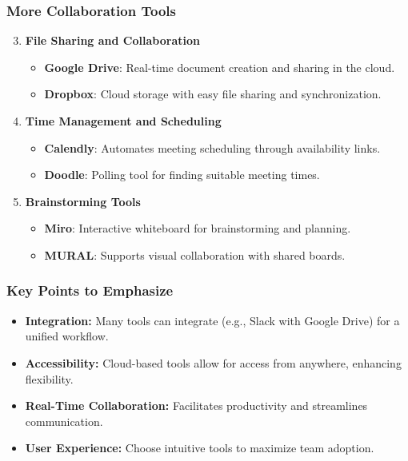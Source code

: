 \documentclass[aspectratio=169]{beamer}
\begin{document}
\begin{frame}[fragile]
    \frametitle{More Collaboration Tools}
    \begin{enumerate}
        \setcounter{enumi}{2} %
        \item \textbf{File Sharing and Collaboration}
        \begin{itemize}
            \item \textbf{Google Drive}: Real-time document creation and sharing in the cloud.
            \item \textbf{Dropbox}: Cloud storage with easy file sharing and synchronization.
        \end{itemize}

        \item \textbf{Time Management and Scheduling}
        \begin{itemize}
            \item \textbf{Calendly}: Automates meeting scheduling through availability links.
            \item \textbf{Doodle}: Polling tool for finding suitable meeting times.
        \end{itemize}

        \item \textbf{Brainstorming Tools}
        \begin{itemize}
            \item \textbf{Miro}: Interactive whiteboard for brainstorming and planning.
            \item \textbf{MURAL}: Supports visual collaboration with shared boards.
        \end{itemize}
    \end{enumerate}
\end{frame}

\begin{frame}[fragile]
    \frametitle{Key Points to Emphasize}
    \begin{itemize}
        \item \textbf{Integration:} Many tools can integrate (e.g., Slack with Google Drive) for a unified workflow.
        \item \textbf{Accessibility:} Cloud-based tools allow for access from anywhere, enhancing flexibility.
        \item \textbf{Real-Time Collaboration:} Facilitates productivity and streamlines communication.
        \item \textbf{User Experience:} Choose intuitive tools to maximize team adoption.
    \end{itemize}
\end{frame}
\end{document}
